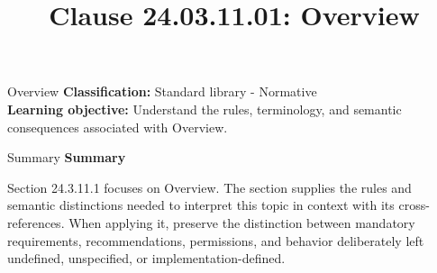 \documentclass[10pt,letterpaper]{article}
\title{Clause 24.03.11.01: Overview}
\author{}
\date{}
\begin{document}
\maketitle
\begin{CornellOverviewBox}{Overview}
\textbf{Classification:} Standard library - Normative\\[2pt]
\textbf{Learning objective:} Understand the rules, terminology, and semantic consequences associated with Overview.
\end{CornellOverviewBox}\begin{CornellSummaryBox}{Summary}
{\sffamily\bfseries\color{Accent} Summary}\par\vspace{3pt}Section 24.3.11.1 focuses on Overview. The section supplies the rules and semantic distinctions needed to interpret this topic in context with its cross-references. When applying it, preserve the distinction between mandatory requirements, recommendations, permissions, and behavior deliberately left undefined, unspecified, or implementation-defined.
\end{CornellSummaryBox}
\end{document}
